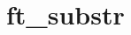 \chapter{ft\+\_\+substr}
\hypertarget{md_Documentation_2ft__substr}{}\label{md_Documentation_2ft__substr}
